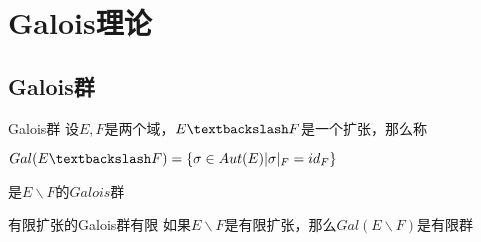 \documentclass[12pt, a4paper, oneside, UTF8]{ctexbook}
\begin{document}
% 
\else
\fi
\chapter{Galois理论}
	\section{Galois群}
		\begin{defn}{Galois群}{}
			设$E,F$是两个域，$E \textbackslash F$是一个扩张，那么称
			
			$Gal(E\textbackslash F) = \{\sigma \in Aut(E) | \sigma |_{F} = id_F\}$
			
			是$E \backslash F$的$Galois$群
		\end{defn}
		\begin{them}{有限扩张的Galois群有限}{}
			如果$E\backslash F$是有限扩张，那么$Gal(E\backslash F)$是有限群
		\end{them}
\ifx\allfiles\undefined
\end{document}
